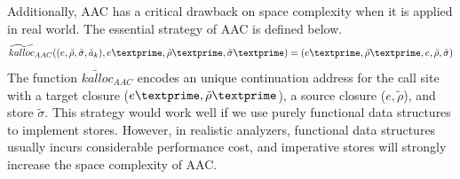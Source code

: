 \documentclass{article}
\begin{document}
Additionally, AAC has a critical drawback on space complexity when it is applied in real world.
The essential strategy of AAC is defined below\cite{gilray2016pushdown}.
\[
\widetilde{kalloc}_{AAC}((e, \tilde{\rho}, \tilde{\sigma}, \tilde{a}_k), e\textprime,  \tilde{\rho}\textprime, \tilde{\sigma}\textprime) = (e\textprime,  \tilde{\rho}\textprime, e, \tilde{\rho}, \tilde{\sigma})
\]
The function $\widetilde{kalloc}_{AAC}$ encodes an unique continuation address for the call site with a target closure ($e\textprime,  \tilde{\rho}\textprime$), a source closure ($e, \tilde{\rho}$), and store $\tilde{\sigma}$.
This strategy would work well if we use purely functional data structures to implement stores.
However, in realistic analyzers, functional data structures usually incurs considerable performance cost, and imperative stores will strongly increase the space complexity of AAC\@.
\end{document}

